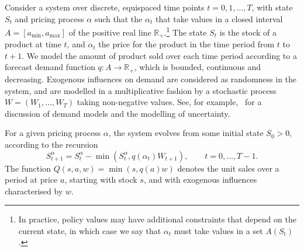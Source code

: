 \documentclass{rsproca_new}
\theoremstyle{definition}
\begin{document}
Consider a system over discrete, equispaced time points
$t=0,1,\dots,T$, with state
$S_t$ and pricing process $\alpha$ such that the $\alpha_t$ that take values in a closed
interval $A=[a_{\mathrm{min}},a_{\mathrm{max}}]$ of the positive real
line $\mathbb R_+$.\footnote{In
  practice, policy values may have additional constraints that depend
  on the current state,
  in which case we say that $\alpha_t$ must take values
  in a set $A(S_t)$.
}
The state $S_t$ is the stock of a product at time $t$, and
$\alpha_t$ the price for the product in the time period from $t$ to
$t+1$. We model the amount of product sold over each time period according
to a forecast demand
function $q:A\to\mathbb R_+$, which is bounded, continuous and decreasing.
Exogenous influences on demand are considered as randomness in the
system, and are
modelled in a multiplicative fashion by a stochastic process
$W=(W_1,\dots,W_T)$ taking non-negative values. See, for
example,~\cite[Ch.~7]{talluri2006theory} for a discussion of
demand models and the modelling of uncertainty.

For a given pricing process $\alpha$, the
system evolves from some initial state $S_0>0$, according to the
recursion
\begin{equation}\label{eq:stock_dynamics}
  S_{t+1}^\alpha=S_t^\alpha-\min(S_t^\alpha,q(\alpha_t)W_{t+1}),\qquad t=0,\dots,T-1.
\end{equation}
The function $Q(s,a,w)=\min(s,q(a)w)$ denotes the unit sales over a
period at price $a$,
starting with stock $s$, and with exogenous influences
characterised by $w$.
\end{document}
